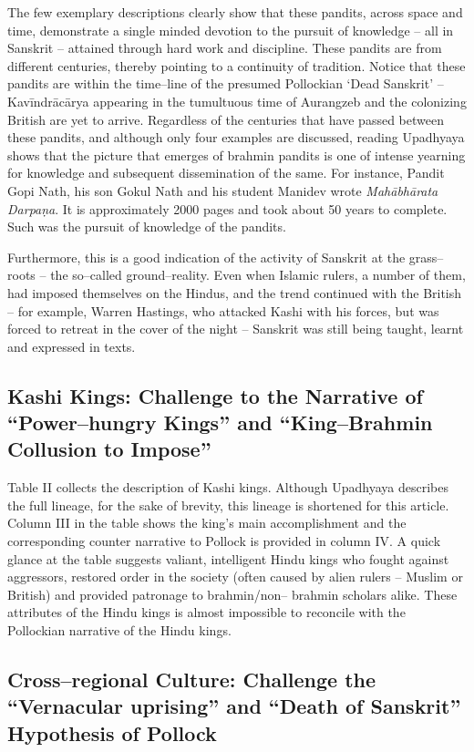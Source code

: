 The few exemplary descriptions clearly show that these pandits, across space and time, demonstrate a single minded devotion to the pursuit of knowledge – all in Sanskrit – attained through hard work and discipline. These pandits are from different centuries, thereby pointing to a continuity of tradition. Notice that these pandits are within the time–line of the presumed Pollockian ‘Dead Sanskrit’ – Kavīndrācārya appearing in the tumultuous time of Aurangzeb and the colonizing British are yet to arrive. Regardless of the centuries that have passed between these pandits, and although only four examples are discussed, reading Upadhyaya shows that the picture that emerges of brahmin pandits is one of intense yearning for knowledge and subsequent dissemination of the same. For instance, Pandit Gopi Nath, his son Gokul Nath and his student Manidev wrote \textit{Mahābhārata Darpaṇa}. It is approximately 2000 pages and took about 50 years to complete. Such was the pursuit of knowledge of the pandits.

Furthermore, this is a good indication of the activity of Sanskrit at the grass–roots – the so–called ground–reality. Even when Islamic rulers, a number of them, had imposed themselves on the Hindus, and the trend continued with the British – for example, Warren Hastings, who attacked Kashi with his forces, but was forced to retreat in the cover of the night – Sanskrit was still being taught, learnt and expressed in texts.


\subsection*{Kashi Kings: Challenge to the Narrative of “Power–hungry Kings” and “King–Brahmin Collusion to Impose”}

Table II collects the description of Kashi kings. Although Upadhyaya describes the full lineage, for the sake of brevity, this lineage is shortened for this article. Column III in the table shows the king’s main accomplishment and the corresponding counter narrative to Pollock is provided in column IV. A quick glance at the table suggests valiant, intelligent Hindu kings who fought against aggressors, restored order in the society (often caused by alien rulers – Muslim or British) and provided patronage to brahmin/non– brahmin scholars alike. These attributes of the Hindu kings is almost impossible to reconcile with the Pollockian narrative of the Hindu kings.


\subsection*{Cross–regional Culture: Challenge the “Vernacular uprising” and “Death of Sanskrit” Hypothesis of Pollock}

